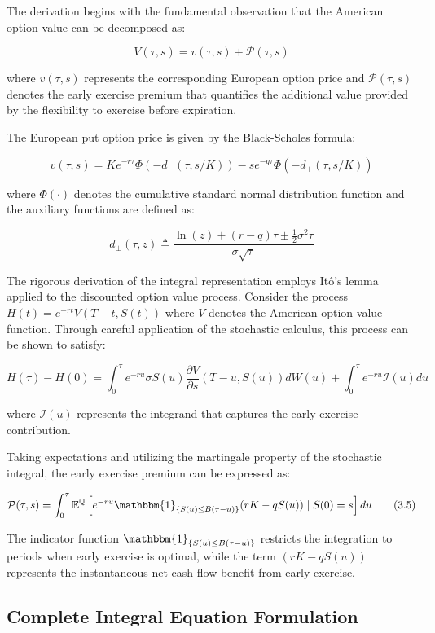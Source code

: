\documentclass[
  american,
  11pt,
  11pt,
  letterpaper,
  onecolumn]{article}
\begin{document}
The derivation begins with the fundamental observation that the American
option value can be decomposed as:

\[V(\tau,s) = v(\tau,s) + \mathcal{P}(\tau,s) \tag{3.1}\]

where \(v(\tau,s)\) represents the corresponding European option price
and \(\mathcal{P}(\tau,s)\) denotes the early exercise premium that
quantifies the additional value provided by the flexibility to exercise
before expiration.

The European put option price is given by the Black-Scholes formula:

\[v(\tau,s) = K e^{-r\tau}\Phi(-d_-(\tau,s/K)) - s e^{-q\tau}\Phi(-d_+(\tau,s/K)) \tag{3.2}\]

where \(\Phi(\cdot)\) denotes the cumulative standard normal
distribution function and the auxiliary functions are defined as:

\[d_{\pm}(\tau,z) \triangleq \frac{\ln(z) + (r-q)\tau \pm \frac{1}{2}\sigma^2\tau}{\sigma\sqrt{\tau}} \tag{3.3}\]

The rigorous derivation of the integral representation employs Itô's
lemma applied to the discounted option value process. Consider the
process \(H(t) = e^{-rt}V(T-t, S(t))\) where \(V\) denotes the American
option value function. Through careful application of the stochastic
calculus, this process can be shown to satisfy:

\[H(\tau) - H(0) = \int_0^\tau e^{-ru} \sigma S(u) \frac{\partial V}{\partial s}(T-u, S(u)) dW(u) + \int_0^\tau e^{-ru} \mathcal{I}(u) du \tag{3.4}\]

where \(\mathcal{I}(u)\) represents the integrand that captures the
early exercise contribution.

Taking expectations and utilizing the martingale property of the
stochastic integral, the early exercise premium can be expressed as:

\[\mathcal{P}(\tau,s) = \int_0^\tau \mathbb{E}^{\mathbb{Q}}\left[e^{-ru} \mathbbm{1}_{\{S(u) \leq B(\tau-u)\}} (rK - qS(u)) \mid S(0) = s\right] du \tag{3.5}\]

The indicator function \(\mathbbm{1}_{\{S(u) \leq B(\tau-u)\}}\)
restricts the integration to periods when early exercise is optimal,
while the term \((rK - qS(u))\) represents the instantaneous net cash
flow benefit from early exercise.

\subsection{Complete Integral Equation
Formulation}\label{complete-integral-equation-formulation}
\end{document}
